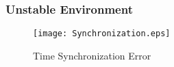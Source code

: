 \documentclass[Main]{subfiles}
\begin{document}
		\subsubsection{Unstable Environment} %
		\label{sub:unstable_environment}
			
			\begin{figure}[H]
				\centering
				\texttt{[image: Synchronization.eps]}
				\caption{Time Synchronization Error}
				\label{fig:Synchronization}
			\end{figure}

	

\end{document}
